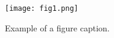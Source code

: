 \begin{figure}[htbp]
\centerline{\texttt{[image: fig1.png]}}
\caption{Example of a figure caption.}
\label{fig}
\end{figure}